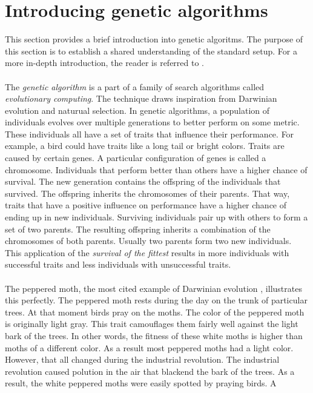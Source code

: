 \section{Introducing genetic algorithms}
This section provides a brief introduction into genetic algoritms. The purpose
of this section is to establish a shared understanding of the standard setup. For a more
in-depth introduction, the reader is referred to \citep{Eiben2007}.\\\\
\noindent
The \emph{genetic algorithm} \citep{Holland1992} is a part of a family of
search algorithms called \emph{evolutionary computing}. The technique draws
inspiration from Darwinian evolution and naturual selection. In genetic
algorithms, a population of individuals evolves over multiple generations to
better perform on some metric. These individuals all have a set of traits that
influence their performance. For example, a bird could have traits like a long
tail or bright colors. Traits are caused by certain genes. A particular
configuration of genes is called a chromosome. Individuals that perform better
than others have a higher chance of survival. The new generation contains the
offspring of the individuals that survived. The offspring inherits the
chromosomes of their parents. That way, traits that have a positive influence
on performance have a higher chance of ending up in new individuals. Surviving
individuals pair up with others to form a set of two parents. The resulting
offspring inherits a combination of the chromosomes of both parents. Usually
two parents form two new individuals. This application of the \emph{survival of
the fittest} results in more individuals with successful traits and less
individuals with unsuccessful traits.\\\\
\noindent
The peppered moth, the most cited example of Darwinian evolution
\citep{Majerus2009}, illustrates this perfectly. The peppered moth rests during
the day on the trunk of particular trees. At that moment birds pray on the
moths. The color of the peppered moth is originally light gray. This trait
camouflages them fairly well against the light bark of the trees. In other
words, the fitness of these white moths is higher than moths of a different
color. As a result most peppered moths had a light color.
However, that all changed during the industrial revolution. The industrial
revolution caused polution in the air that blackend the bark of the trees. As a
result, the white peppered moths were easily spotted by praying birds. A
